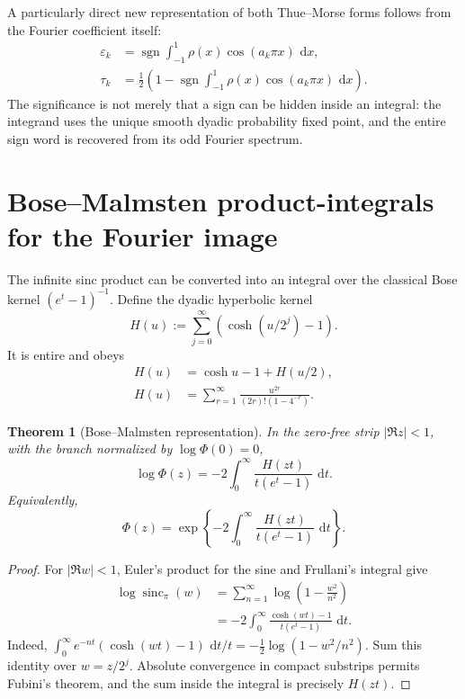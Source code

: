 \documentclass[11pt]{article}
\newtheorem{theorem}{Theorem}[section]
\theoremstyle{definition}
\theoremstyle{remark}
\newcommand{\dd}{\,\mathrm d}
\newcommand{\sgn}{\operatorname{sgn}}
\newcommand{\eps}{\varepsilon}
\newcommand{\sincpi}{\operatorname{sinc}_{\pi}}
\begin{document}
A particularly direct new representation of both Thue--Morse forms follows from the
Fourier coefficient itself:
\begin{align}
 \eps_k
 &=\sgn\!\int_{-1}^{1}\rho(x)\cos(a_k\pi x)\,\dd x,       \label{eq:tm-up-integral-sign}\\
 \tau_k
 &=\frac12\left(1-
 \sgn\!\int_{-1}^{1}\rho(x)\cos(a_k\pi x)\,\dd x\right). \label{eq:tm-up-integral-bit}
\end{align}
The significance is not merely that a sign can be hidden inside an integral: the integrand
uses the unique smooth dyadic probability fixed point, and the entire sign word is recovered
from its odd Fourier spectrum.

\section{Bose--Malmsten product-integrals for the Fourier image}
\label{sec:malmsten}

The infinite sinc product can be converted into an integral over the classical Bose kernel
\((e^t-1)^{-1}\).  Define the dyadic hyperbolic kernel
\begin{equation}
 H(u):=\sum_{j=0}^{\infty}\left(\cosh(u/2^j)-1\right).      \label{eq:H-kernel}
\end{equation}
It is entire and obeys
\begin{align}
 H(u)&=\cosh u-1+H(u/2),                                   \label{eq:H-refine}\\
 H(u)&=\sum_{r=1}^{\infty}
       \frac{u^{2r}}{(2r)!(1-4^{-r})}.                     \label{eq:H-power}
\end{align}

\begin{theorem}[Bose--Malmsten representation]
\label{thm:malmsten}
In the zero-free strip \(|\Re z|<1\), with the branch normalized by
\(\log\Phi(0)=0\),
\begin{equation}
\boxed{
 \log\Phi(z)
 =-2\int_0^\infty
   \frac{H(zt)}{t(e^t-1)}\,\dd t.}                         \label{eq:logPhi-malmsten}
\end{equation}
Equivalently,
\begin{equation}
\boxed{
 \Phi(z)=\exp\!\left\{-2\int_0^\infty
   \frac{H(zt)}{t(e^t-1)}\,\dd t\right\}.}               \label{eq:Phi-product-integral}
\end{equation}
\end{theorem}

\begin{proof}
For \(|\Re w|<1\), Euler's product for the sine and Frullani's integral give
\begin{align*}
 \log\sincpi(w)
 &=\sum_{n=1}^{\infty}\log\left(1-\frac{w^2}{n^2}\right)\\
 &=-2\int_0^\infty
   \frac{\cosh(wt)-1}{t(e^t-1)}\,\dd t.
\end{align*}
Indeed,
\(
 \int_0^\infty e^{-nt}(\cosh(wt)-1)\,\dd t/t
 =-\tfrac12\log(1-w^2/n^2)
\).
Sum this identity over \(w=z/2^j\).  Absolute convergence in compact
substrips permits Fubini's theorem, and the sum inside the integral is precisely
\(H(zt)\).
\end{proof}
\end{document}

